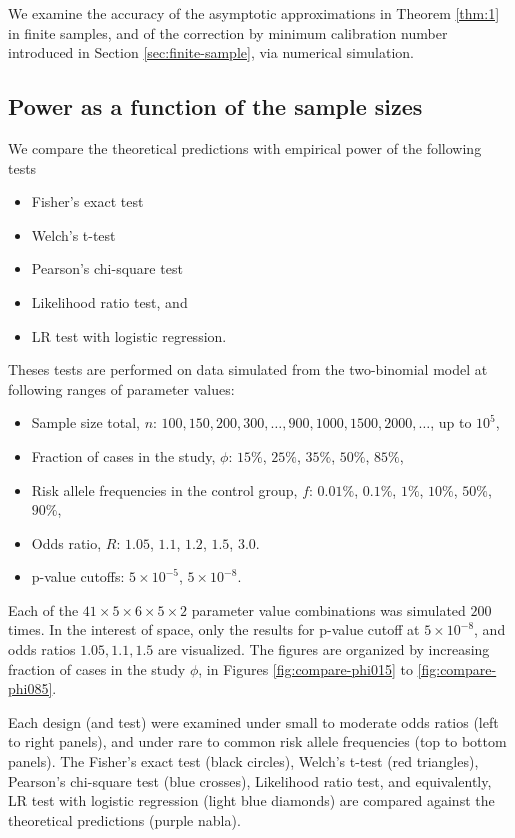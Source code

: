 We examine the accuracy of the asymptotic approximations in Theorem \ref{thm:1} in finite samples, and of the correction by minimum calibration number introduced in Section \ref{sec:finite-sample}, via numerical simulation.

\subsection{Power as a function of the sample sizes}

We compare the theoretical predictions with empirical power of the following tests
\begin{itemize}
    \item Fisher's exact test
    \item Welch's t-test
    \item Pearson's chi-square test
    \item Likelihood ratio test, and 
    \item LR test with logistic regression.
\end{itemize}
Theses tests are performed on data simulated from the two-binomial model at following ranges of parameter values:
\begin{itemize}
    \item Sample size total, $n$: $100, 150, 200, 300, \ldots, 900, 1000, 1500, 2000, \ldots$, up to $10^5$,
    \item Fraction of cases in the study, $\phi$: $15\%$, $25\%$, $35\%$, $50\%$, $85\%$,
    \item Risk allele frequencies in the control group, $f$: $0.01\%$, $0.1\%$, $1\%$, $10\%$, $50\%$, $90\%$,
    \item Odds ratio, $R$: $1.05$, $1.1$, $1.2$, $1.5$, $3.0$.
    \item p-value cutoffs: $5\times 10^{-5}$, $5\times 10^{-8}$.
\end{itemize}
Each of the $41\times5\times6\times5\times2$ parameter value combinations was simulated $200$ times.
In the interest of space, only the results for p-value cutoff at $5\times 10^{-8}$, and odds ratios $1.05, 1.1, 1.5$ are visualized.
The figures are organized by increasing fraction of cases in the study $\phi$, in Figures \ref{fig:compare-phi015} to \ref{fig:compare-phi085}.

Each design (and test) were examined under small to moderate odds ratios (left to right panels), and under rare to common risk allele frequencies (top to bottom panels).
The Fisher's exact test (black circles), Welch's t-test (red triangles), Pearson's chi-square test (blue crosses), Likelihood ratio test, and equivalently, LR test with logistic regression (light blue diamonds) are compared against the theoretical predictions (purple nabla).

